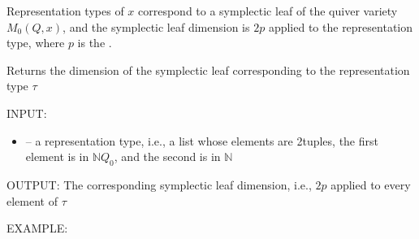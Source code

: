 \documentclass[letterpaper,10pt,english]{sphinxmanual}
\begin{document}
\sphinxAtStartPar
Representation types of \(x\) correspond to a symplectic leaf of the quiver variety \(M_0(Q,x)\), and the symplectic leaf dimension is \(2p\) applied to the representation type, where \(p\) is the .

\begin{fulllineitems}
\label{\detokenize{index:quivercombinatorics.quivercombinatorics.Quiver.symplectic_leaf_dimension}}
\pysigstartsignatures
\pysiglinewithargsret
{}
{}
{}
\pysigstopsignatures
\sphinxAtStartPar
Returns the dimension of the symplectic leaf corresponding to the representation type \(\tau\)

\sphinxAtStartPar
INPUT:
\begin{itemize}
\item {} 
\sphinxAtStartPar
{} – a representation type, i.e., a list whose elements are 2\sphinxhyphen{}tuples, the first element is in \(\mathbb{N}Q_0\), and the second is in \(\mathbb{N}\)

\end{itemize}

\sphinxAtStartPar
OUTPUT: The corresponding symplectic leaf dimension, i.e., \(2p\) applied to every element of \(\tau\)

\sphinxAtStartPar
EXAMPLE:

\begin{sphinxVerbatim}[commandchars=\\\{\}]
  
   \PYG{p}{[}\PYG{p}{[} \PYG{p}{]} \PYG{p}{[} \PYG{p}{]}\PYG{p}{]}
 \PYG{p}{[}\PYG{p}{[}  \PYG{p}{]} \PYG{p}{[}  \PYG{p}{]}\PYG{p}{]}
\end{sphinxVerbatim}

\end{fulllineitems}
\end{document}
